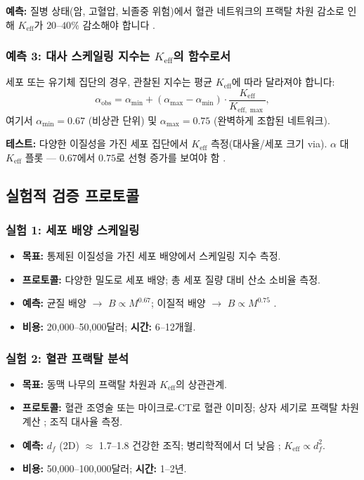\documentclass[11pt,a4paper]{article}
\newcommand{\Keff}{K_{\mathrm{eff}}}
\begin{document}
	\textbf{예측:} 질병 상태(암, 고혈압, 뇌졸중 위험)에서 혈관 네트워크의 프랙탈 차원 감소로 인해 \(\Keff\)가 \(20\)–\(40\%\) 감소해야 합니다 \cite{Gould1993}.
	
	\subsubsection{예측 3: 대사 스케일링 지수는 \(\Keff\)의 함수로서}
	
	세포 또는 유기체 집단의 경우, 관찰된 지수는 평균 \(\Keff\)에 따라 달라져야 합니다:
	\begin{equation}
		\alpha_{\text{obs}} = \alpha_{\min} + (\alpha_{\max} - \alpha_{\min}) \cdot \frac{\Keff}{K_{\mathrm{eff},\max}},
		\label{eq:scaling-exponent}
	\end{equation}
	여기서 \(\alpha_{\min} = 0.67\) (비상관 단위) 및 \(\alpha_{\max} = 0.75\) (완벽하게 조합된 네트워크).
	
	\textbf{테스트:} 다양한 이질성을 가진 세포 집단에서 \(\Keff\) 측정(대사율/세포 크기 via). \(\alpha\) 대 \(\Keff\) 플롯 — \(0.67\)에서 \(0.75\)로 선형 증가를 보여야 함 \cite{Takemoto2015}.
	
	\subsection{실험적 검증 프로토콜}
	
	\subsubsection{실험 1: 세포 배양 스케일링}
	\begin{itemize}
		\item \textbf{목표:} 통제된 이질성을 가진 세포 배양에서 스케일링 지수 측정.
		\item \textbf{프로토콜:} 다양한 밀도로 세포 배양; 총 세포 질량 대비 산소 소비율 측정.
		\item \textbf{예측:} 균질 배양 \(\rightarrow\) \(B \propto M^{0.67}\); 이질적 배양 \(\rightarrow\) \(B \propto M^{0.75}\) \cite{Takemoto2015}.
		\item \textbf{비용:} 20,000–50,000달러; \textbf{시간:} 6–12개월.
	\end{itemize}
	
	\subsubsection{실험 2: 혈관 프랙탈 분석}
	\begin{itemize}
		\item \textbf{목표:} 동맥 나무의 프랙탈 차원과 \(\Keff\)의 상관관계.
		\item \textbf{프로토콜:} 혈관 조영술 또는 마이크로-CT로 혈관 이미징; 상자 세기로 프랙탈 차원 계산 \cite{Cross1993}; 조직 대사율 측정.
		\item \textbf{예측:} \(d_f\) (2D) \(\approx\) 1.7–1.8 건강한 조직; 병리학적에서 더 낮음 \cite{Gould1993}; \(\Keff \propto d_f^2\).
		\item \textbf{비용:} 50,000–100,000달러; \textbf{시간:} 1–2년.
	\end{itemize}
	
\end{document}
